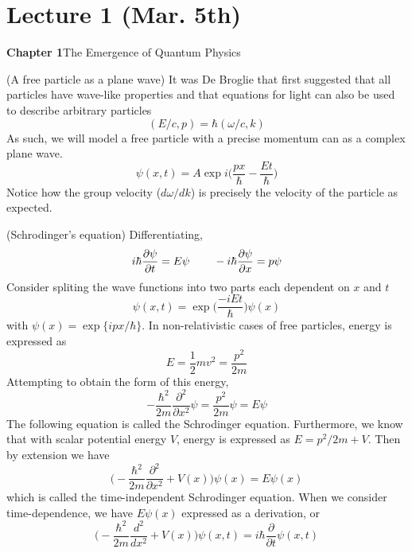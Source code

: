 \section{Lecture 1 (Mar. 5th)}
\textbf{Chapter 1}\hspace{2ex}The Emergence of Quantum Physics
\\
\begin{thm} 
(A free particle as a plane wave) It was De Broglie that first suggested that all particles have wave-like properties and that equations for light can also be used to describe arbitrary particles
\[(E/c, p)=\hbar (\omega/c ,{ k} ) \]
As such, we will model a free particle with a precise momentum can as a complex plane wave.
\[\psi (x,t)=A \exp i\Big(\dfrac{{ p}{ x}}{\hbar}-\dfrac{Et}{\hbar}\Big)\]
Notice how the group velocity ($d\omega /dk$) is precisely the velocity of the particle as expected.\end{thm}
\vspace{2ex}
\begin{defi}
(Schrodinger's equation)
Differentiating, 
\[i\hbar\dfrac{\partial \psi }{\partial t}=E\psi\hspace{5ex}-i\hbar \dfrac{\partial \psi }{\partial x}  =p\psi   \]
Consider spliting the wave functions into two parts each dependent on $x$ and $t$
\[\psi (x,t)=\exp{\Big(\dfrac{-iEt}{\hbar}\Big)}\psi (x)\]
with $\psi (x)=\exp\{i{p}{ x}/\hbar\}$. In non-relativistic cases of free particles, energy is expressed as
\[E=\dfrac{1}{2}mv^2=\dfrac{p^2}{2m}\]
Attempting to obtain the form of this energy,
\[-\dfrac{\hbar^2}{2m}\dfrac{\partial ^2}{\partial x^2} \psi =\dfrac{p ^2}{2m}\psi =E\psi \]
The following equation is called the Schrodinger equation. Furthermore, we know that with scalar potential energy $V$, energy is expressed as $E=p^2/2m +V$. Then by extension we have
\[\Big(-\dfrac{\hbar^2}{2m}\dfrac{\partial ^2}{\partial x^2} +V(x)\Big)\psi (x)=E\psi (x)\]
which is called the time-independent Schrodinger equation. When we consider time-dependence, we have $E\psi(x)$ expressed as a derivation, or
\[\Big(-\dfrac{\hbar^2}{2m}\dfrac{d ^2}{d x^2} +V(x)\Big)\psi (x,t)=i\hbar\dfrac{\partial }{\partial t}\psi (x,t) \]
\end{defi}
\vspace{2ex}


